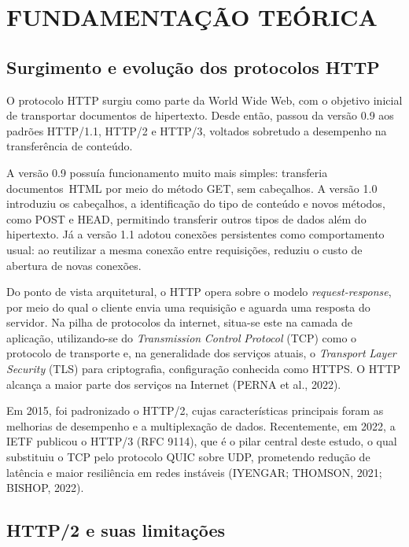 ﻿\chapter{FUNDAMENTAÇÃO TEÓRICA}\label{cap:fundamentacao}

\section{Surgimento e evolução dos protocolos HTTP}

O protocolo HTTP surgiu como parte da World Wide Web, com o objetivo inicial de transportar documentos de hipertexto. Desde então, passou da versão 0.9 aos padrões HTTP/1.1, HTTP/2 e HTTP/3, voltados sobretudo a desempenho na transferência de conteúdo.

A versão 0.9 possuía funcionamento muito mais simples: transferia documentos~\allowbreak HTML por meio do método GET, sem cabeçalhos. A versão 1.0 introduziu os cabeçalhos, a identificação do tipo de conteúdo e novos métodos, como POST e HEAD, permitindo transferir outros tipos de dados além do hipertexto. Já a versão 1.1 adotou conexões persistentes como comportamento usual: ao reutilizar a mesma conexão entre requisições, reduziu o custo de abertura de novas conexões.

Do ponto de vista arquitetural, o HTTP opera sobre o modelo \textit{request}\textit{-response}, por meio do qual o cliente envia uma requisição e aguarda uma resposta do servidor. Na pilha de protocolos da internet, situa-se este na camada de aplicação, utilizando-se do \textit{Transmission}\textit{ }\textit{Control}\textit{ }\textit{Protocol}\textit{ }(TCP) como o protocolo de transporte e, na generalidade dos serviços atuais, o \textit{Transport}\textit{ }\textit{Layer}\textit{ Security} (TLS) para criptografia, configuração conhecida como HTTPS. O HTTP alcança a maior parte dos serviços na Internet (PERNA et al., 2022).

Em 2015, foi padronizado o HTTP/2, cujas características principais foram as melhorias de desempenho e a multiplexação de dados. Recentemente, em 2022, a IETF publicou o HTTP/3 (RFC 9114), que é o pilar central deste estudo, o qual substituiu o TCP pelo protocolo QUIC sobre UDP, prometendo redução de latência e maior resiliência em redes instáveis (IYENGAR; THOMSON, 2021; BISHOP, 2022).

\section{HTTP/2 e suas limitações}

